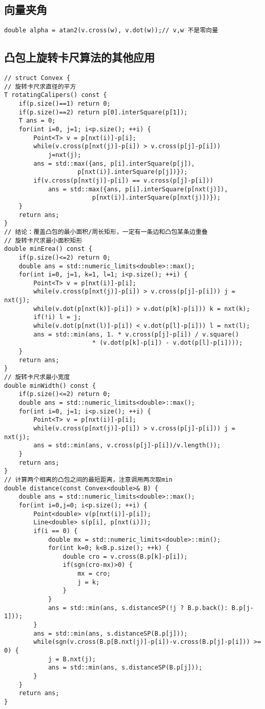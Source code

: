 \subsection{向量夹角}
\begin{lstlisting}
double alpha = atan2(v.cross(w), v.dot(w));// v,w 不是零向量
\end{lstlisting}

\subsection{凸包上旋转卡尺算法的其他应用}
\begin{lstlisting}
// struct Convex {
// 旋转卡尺求直径的平方
T rotatingCalipers() const {
    if(p.size()==1) return 0;
    if(p.size()==2) return p[0].interSquare(p[1]);
    T ans = 0;
    for(int i=0, j=1; i<p.size(); ++i) {
        Point<T> v = p[nxt(i)]-p[i];
        while(v.cross(p[nxt(j)]-p[i]) > v.cross(p[j]-p[i]))
            j=nxt(j);
        ans = std::max({ans, p[i].interSquare(p[j]), 
                    p[nxt(i)].interSquare(p[j])});
        if(v.cross(p[nxt(j)]-p[i]) == v.cross(p[j]-p[i]))
            ans = std::max({ans, p[i].interSquare(p[nxt(j)]), 
                        p[nxt(i)].interSquare(p[nxt(j)])});
    }
    return ans;
}
// 结论：覆盖凸包的最小面积/周长矩形，一定有一条边和凸包某条边重叠
// 旋转卡尺求最小面积矩形
double minErea() const {
    if(p.size()<=2) return 0;
    double ans = std::numeric_limits<double>::max();
    for(int i=0, j=1, k=1, l=1; i<p.size(); ++i) {
        Point<T> v = p[nxt(i)]-p[i];
        while(v.cross(p[nxt(j)]-p[i]) > v.cross(p[j]-p[i])) j = nxt(j);
        while(v.dot(p[nxt(k)]-p[i]) > v.dot(p[k]-p[i])) k = nxt(k);
        if(!i) l = j;
        while(v.dot(p[nxt(l)]-p[i]) < v.dot(p[l]-p[i])) l = nxt(l);
        ans = std::min(ans, 1. * v.cross(p[j]-p[i]) / v.square()
                        * (v.dot(p[k]-p[i]) - v.dot(p[l]-p[i])));
    }
    return ans;
}
// 旋转卡尺求最小宽度
double minWidth() const {
    if(p.size()<=2) return 0;
    double ans = std::numeric_limits<double>::max();
    for(int i=0, j=1; i<p.size(); ++i) {
        Point<T> v = p[nxt(i)]-p[i];
        while(v.cross(p[nxt(j)]-p[i]) > v.cross(p[j]-p[i])) j = nxt(j);
        ans = std::min(ans, v.cross(p[j]-p[i])/v.length());
    }
    return ans;
}
// 计算两个相离的凸包之间的最短距离，注意调用两次取min
double distance(const Convex<double>& B) {
    double ans = std::numeric_limits<double>::max();
    for(int i=0,j=0; i<p.size(); ++i) {
        Point<double> v(p[nxt(i)]-p[i]);
        Line<double> s(p[i], p[nxt(i)]);
        if(i == 0) {
            double mx = std::numeric_limits<double>::min();
            for(int k=0; k<B.p.size(); ++k) {
                double cro = v.cross(B.p[k]-p[i]);
                if(sgn(cro-mx)>0) {
                    mx = cro;
                    j = k;
                }
            }
            ans = std::min(ans, s.distanceSP(!j ? B.p.back(): B.p[j-1]));
        }
        ans = std::min(ans, s.distanceSP(B.p[j]));
        while(sgn(v.cross(B.p[B.nxt(j)]-p[i])-v.cross(B.p[j]-p[i])) >= 0) {
            j = B.nxt(j);
            ans = std::min(ans, s.distanceSP(B.p[j]));
        }
    }
    return ans;
}
\end{lstlisting}

